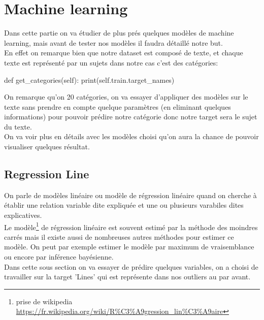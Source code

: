 \documentclass[english,a4paper,11pt,oneside]{article}
\begin{document}
	\section{Machine learning}{
		Dans cette partie on va étudier de plus prés quelques modèles de machine learning, mais avant de tester nos modèles il faudra détaillé notre but.\\
		En effet on remarque bien que notre dataset est composé de texte, et chaque texte est représenté par un sujets dans notre cas c'est des catégories:\\
		\begin{pythonn}
def get_categories(self):
	print(self.train.target_names)
		\end{pythonn}
		\newpage
		On remarque qu'on 20 catégories, on va essayer d'appliquer des modèles sur le texte sans prendre en compte quelque paramètres (en eliminant quelques informations) pour pouvoir prédire notre catégorie donc notre target sera le sujet du texte.\\
		On va voir plus en détails avec les modèles choisi qu'on aura la chance de pouvoir visualiser quelques résultat.\\
		
		\subsection{Regression Line}{
			On parle de modèles linéaire ou modèle de régression linéaire quand on cherche à établir une relation variable dite expliquée et une ou plusieurs varabiles dites explicatives.\\
			Le modèle\footnote{prise de wikipedia \url{https://fr.wikipedia.org/wiki/R\%C3\%A9gression\_lin\%C3\%A9aire} } de régression linéaire est souvent estimé par la méthode des moindres carrés mais il existe aussi de nombreuses autres méthodes pour estimer ce modèle. On peut par exemple estimer le modèle par maximum de vraisemblance ou encore par inférence bayésienne.\\
			Dans cette sous section on va essayer de prédire quelques variables, on a choisi de travailler sur la target 'Lines' qui est représente dans nos outliers au par avant.\\
			
		}
}
\end{document}
